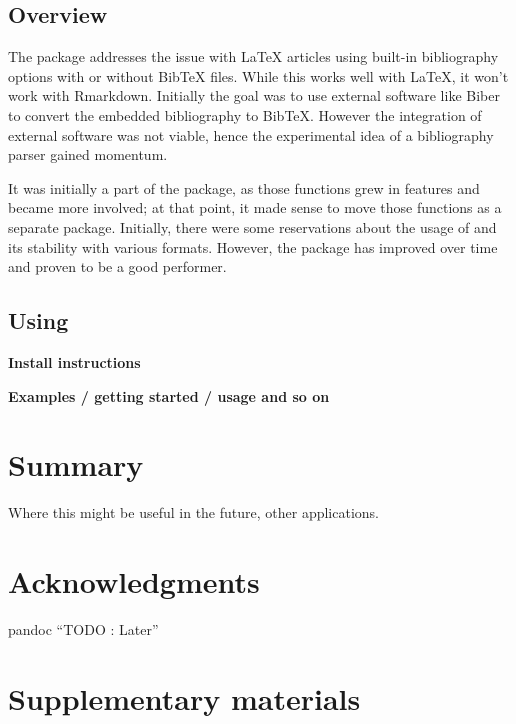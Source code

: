 \hypertarget{overview}{%
\subsection{Overview}\label{overview}}

The  package addresses the issue with LaTeX articles using built-in bibliography options with or without BibTeX files. While this works well with LaTeX, it won't work with Rmarkdown. Initially the goal was to use external software like Biber to convert the embedded bibliography to BibTeX.
However the integration of external software was not viable, hence the experimental idea of a bibliography parser gained momentum.

It was initially a part of the  package, as those functions grew in features and became more involved; at that point, it made sense to move those functions as a separate package. Initially, there were some reservations about
the usage of  and its stability with various formats. However, the package has improved over time and proven to be a good performer.

\hypertarget{using-1}{%
\subsection{\texorpdfstring{Using }{Using }}\label{using-1}}

\textbf{Install instructions}

\textbf{Examples / getting started / usage and so on}

\hypertarget{summary}{%
\section{Summary}\label{summary}}

Where this might be useful in the future, other applications.

\hypertarget{acknowledgments}{%
\section{Acknowledgments}\label{acknowledgments}}

pandoc
``TODO : Later''

\hypertarget{supplementary-materials}{%
\section{Supplementary materials}\label{supplementary-materials}}

